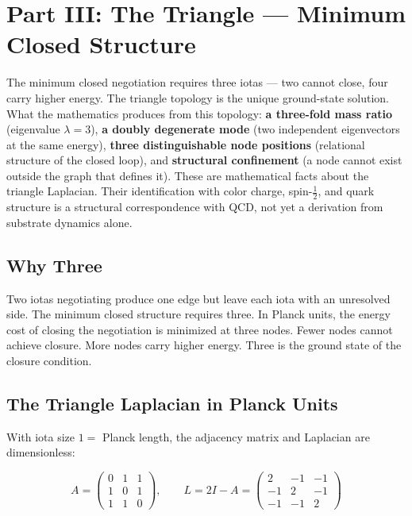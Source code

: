 \documentclass[11pt,letterpaper]{article}
\newenvironment{plainbox}{\begin{tcolorbox}[colback=blue!3!white,colframe=blue!40!white,title={\small\textit{In plain language}},breakable]}{\end{tcolorbox}}
\begin{document}
\section{Part III: The Triangle --- Minimum Closed Structure}
\label{sec:org26a9eff}

\begin{plainbox}
The minimum closed negotiation requires three iotas --- two cannot close, four carry higher energy. The triangle topology is the unique ground-state solution. What the mathematics produces from this topology: \textbf{a three-fold mass ratio} (eigenvalue \(\lambda = 3\)), \textbf{a doubly degenerate mode} (two independent eigenvectors at the same energy), \textbf{three distinguishable node positions} (relational structure of the closed loop), and \textbf{structural confinement} (a node cannot exist outside the graph that defines it). These are mathematical facts about the triangle Laplacian. Their identification with color charge, spin-$\frac{1}{2}$, and quark structure is a structural correspondence with QCD, not yet a derivation from substrate dynamics alone.
\end{plainbox}

\subsection{Why Three}
\label{sec:orgc560a74}

Two iotas negotiating produce one edge but leave each iota with an unresolved side. The minimum closed structure requires three. In Planck units, the energy cost of closing the negotiation is minimized at three nodes. Fewer nodes cannot achieve closure. More nodes carry higher energy. Three is the ground state of the closure condition.

\subsection{The Triangle Laplacian in Planck Units}
\label{sec:org0107ad9}

With iota size \(1 =\) Planck length, the adjacency matrix and Laplacian are dimensionless:

\begin{equation}
A = \begin{pmatrix} 0 & 1 & 1 \\ 1 & 0 & 1 \\ 1 & 1 & 0 \end{pmatrix}, \qquad
L = 2I - A = \begin{pmatrix} 2 & -1 & -1 \\ -1 & 2 & -1 \\ -1 & -1 & 2 \end{pmatrix}
\end{equation}
\end{document}
